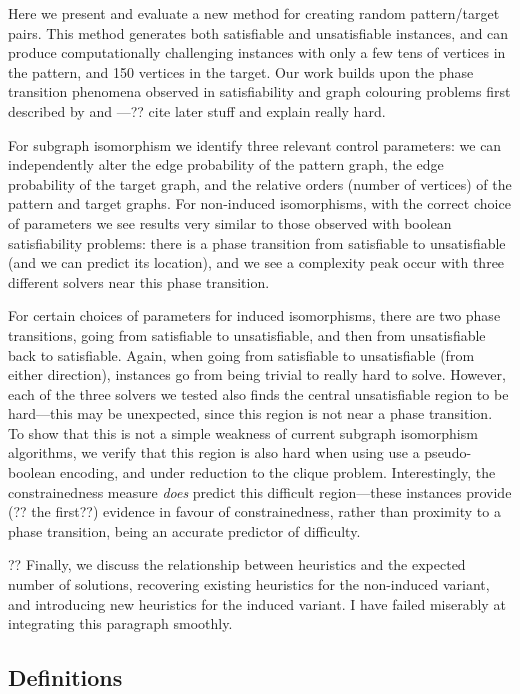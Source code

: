 \documentclass[letterpaper]{article}
\begin{document}
Here we present and evaluate a new method for creating random pattern/target pairs. This method
generates both satisfiable and unsatisfiable instances, and can produce computationally challenging
instances with only a few tens of vertices in the pattern, and 150 vertices in the target. Our work
builds upon the phase transition phenomena observed in satisfiability and graph colouring problems
first described by \citet{Cheeseman:1991} and \citet{Mitchell:1992}---?? cite later stuff and
explain really hard.

For subgraph isomorphism we identify three relevant control parameters: we can independently alter
the edge probability of the pattern graph, the edge probability of the target graph, and the
relative orders (number of vertices) of the pattern and target graphs.  For non-induced
isomorphisms, with the correct choice of parameters we see results very similar to those observed
with boolean satisfiability problems: there is a phase transition from satisfiable to unsatisfiable
(and we can predict its location), and we see a complexity peak occur with three different solvers
near this phase transition.

For certain choices of parameters for induced isomorphisms, there are two phase transitions, going
from satisfiable to unsatisfiable, and then from unsatisfiable back to satisfiable. Again, when
going from satisfiable to unsatisfiable (from either direction), instances go from being trivial to
really hard to solve. However, each of the three solvers we tested also finds the central
unsatisfiable region to be hard---this may be unexpected, since this region is not near a
phase transition. To show that this is not a simple weakness of current subgraph isomorphism
algorithms, we verify that this region is also hard when using use a pseudo-boolean encoding, and
under reduction to the clique problem. Interestingly, the constrainedness measure
\citep{Gent:1996:Kappa} \emph{does} predict this difficult region---these instances provide (?? the
first??) evidence in favour of constrainedness, rather than proximity to a phase transition, being
an accurate predictor of difficulty.

?? Finally, we discuss the relationship between heuristics and the expected number of solutions,
recovering existing heuristics for the non-induced variant, and introducing new heuristics for the
induced variant. I have failed miserably at integrating this paragraph smoothly.

\subsection{Definitions}
\end{document}
